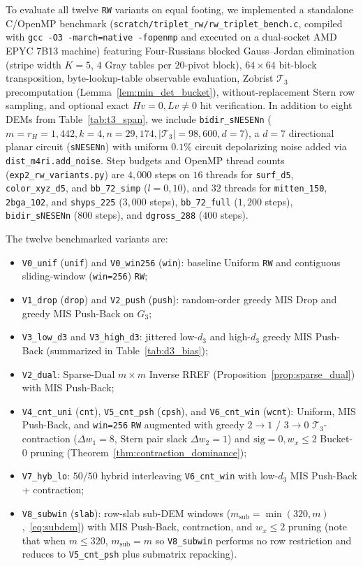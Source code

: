 \documentclass[12pt]{article}
\theoremstyle{definition}
\newcommand{\Tc}{\mathcal{T}_3}
\newcommand{\ttt}[1]{\texttt{#1}}
\begin{document}
To evaluate all twelve \ttt{RW} variants on equal footing, we implemented a standalone C/OpenMP benchmark
(\ttt{scratch/triplet\_rw/rw\_triplet\_bench.c}, compiled with \ttt{gcc -O3 -march=native -fopenmp} and executed on
a dual-socket AMD EPYC 7B13 machine) featuring Four-Russians blocked Gauss--Jordan elimination (stripe width $K =
5$, $4$ Gray tables per $20$-pivot block), $64 \times 64$ bit-block transposition, byte-lookup-table observable
evaluation, Zobrist $\Tc$ precomputation (Lemma~\ref{lem:min_det_bucket}), without-replacement Stern row sampling,
and optional exact $H v = 0, L v \neq 0$ hit verification. In addition to eight DEMs from Table~\ref{tab:t3_span},
we include \ttt{bidir\_sNESENn} ($m = r_H = 1{,}442, k = 4, n = 29{,}174, |\Tc| = 98{,}600, d = 7$), a $d = 7$
directional planar circuit (\ttt{sNESENn}) with uniform $0.1\%$ circuit depolarizing noise added via
\ttt{dist\_m4ri.add\_noise}. Step budgets and OpenMP thread counts (\ttt{exp2\_rw\_variants.py}) are $4{,}000$
steps on $16$ threads for \ttt{surf\_d5}, \ttt{color\_xyz\_d5}, and \ttt{bb\_72\_simp} ($l = 0, 10$), and $32$
threads for \ttt{mitten\_150}, \ttt{2bga\_102}, and \ttt{shyps\_225} ($3{,}000$ steps), \ttt{bb\_72\_full}
($1{,}200$ steps), \ttt{bidir\_sNESENn} ($800$ steps), and \ttt{dgross\_288} ($400$ steps).

The twelve benchmarked variants are:
\begin{itemize}
  \item \ttt{V0\_unif} (\ttt{unif}) and \ttt{V0\_win256} (\ttt{win}): baseline Uniform \ttt{RW} and contiguous
    sliding-window (\ttt{win=256}) \ttt{RW};
  \item \ttt{V1\_drop} (\ttt{drop}) and \ttt{V2\_push} (\ttt{push}): random-order greedy MIS Drop and greedy MIS
    Push-Back on $G_3$;
  \item \ttt{V3\_low\_d3} and \ttt{V3\_high\_d3}: jittered low-$d_3$ and high-$d_3$ greedy MIS Push-Back
    (summarized in Table~\ref{tab:d3_bias});
  \item \ttt{V2\_dual}: Sparse-Dual $m \times m$ Inverse RREF (Proposition~\ref{prop:sparse_dual}) with MIS
    Push-Back;
  \item \ttt{V4\_cnt\_uni} (\ttt{cnt}), \ttt{V5\_cnt\_psh} (\ttt{cpsh}), and \ttt{V6\_cnt\_win} (\ttt{wcnt}):
    Uniform, MIS Push-Back, and \ttt{win=256} \ttt{RW} augmented with greedy $2 \to 1$ / $3 \to 0$
    $\Tc$-contraction ($\Delta w_1 = 8$, Stern pair slack $\Delta w_2 = 1$) and $\mathrm{sig}=0, w_x \le 2$
    Bucket-0 pruning (Theorem~\ref{thm:contraction_dominance});
  \item \ttt{V7\_hyb\_lo}: $50/50$ hybrid interleaving \ttt{V6\_cnt\_win} with low-$d_3$ MIS Push-Back +
    contraction;
  \item \ttt{V8\_subwin} (\ttt{slab}): row-slab sub-DEM windows ($m_{\mathrm{sub}} = \min(320, m)$,~\eqref{eq:subdem})
    with MIS Push-Back, contraction, and $w_x \le 2$ pruning (note that when $m \le 320$, $m_{\mathrm{sub}} = m$ so
    \ttt{V8\_subwin} performs no row restriction and reduces to \ttt{V5\_cnt\_psh} plus submatrix repacking).
\end{itemize}
\end{document}
